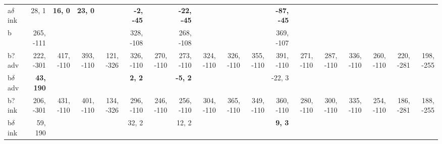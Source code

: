 \begin{table}[p]
{\begin{tabular}{lrrrrrrrrrrrrrrrrr}
a$\delta$ ink & 28, 1 & \textbf{16, 0} & \textbf{23, 0} &  & \textbf{-2, -45} &  & \textbf{-22, -45} &  &  &  & \textbf{-87, -45} &  &  &  &  &  &  \\
b & 265, -111 &  &  &  & 328, -108 &  & 268, -108 &  &  &  & 369, -107 &  &  &  &  &  &  \\
b? adv & 222, -301 & 417, -110 & 393, -110 & 121, -326 & 326, -110 & 270, -110 & 273, -110 & 324, -110 & 326, -110 & 355, -110 & 391, -110 & 271, -110 & 287, -110 & 336, -110 & 260, -110 & 220, -281 & 198, -255 \\
b$\delta$ adv & \textbf{43, 190} &  &  &  & \textbf{2, 2} &  & \textbf{-5, 2} &  &  &  & -22, 3 &  &  &  &  &  &  \\
b? ink & 206, -301 & 431, -110 & 401, -110 & 134, -326 & 296, -110 & 246, -110 & 256, -110 & 304, -110 & 365, -110 & 349, -110 & 360, -110 & 280, -110 & 300, -110 & 335, -110 & 254, -110 & 186, -281 & 188, -255 \\
b$\delta$ ink & 59, 190 &  &  &  & 32, 2 &  & 12, 2 &  &  &  & \textbf{9, 3} &  &  &  &  &  &  \\

\end{tabular}
}
\end{table}
\clearpage


